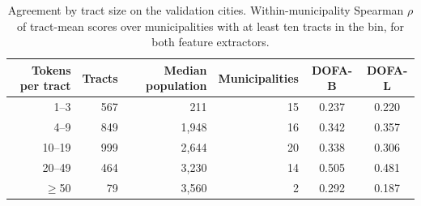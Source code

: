 \begin{table}[htbp]
\centering
\caption{Agreement by tract size on the validation cities. Within-municipality Spearman $\rho$ of tract-mean scores over municipalities with at least ten tracts in the bin, for both feature extractors.}
\small
\begin{tabular}{rrrrcc}
\toprule
Tokens per tract & Tracts & Median population & Municipalities & DOFA-B & DOFA-L\\
\midrule
1--3 & 567 & 211 & 15 & 0.237 & 0.220\\
4--9 & 849 & 1{,}948 & 16 & 0.342 & 0.357\\
10--19 & 999 & 2{,}644 & 20 & 0.338 & 0.306\\
20--49 & 464 & 3{,}230 & 14 & 0.505 & 0.481\\
$\geq$50 & 79 & 3{,}560 & 2 & 0.292 & 0.187\\
\bottomrule
\end{tabular}
\label{tab:maup}
\end{table}
